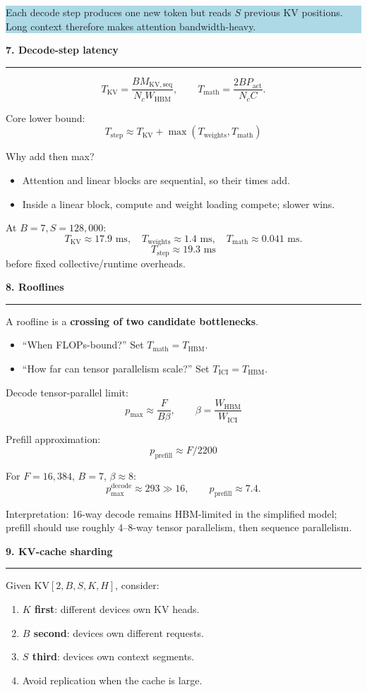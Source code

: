 \documentclass[8pt,a4paper]{extarticle}
\newcommand{\sect}[1]{%
  \vspace{2pt}%
  {\color{DeepBlue}\normalsize\bfseries #1}\par
  \vspace{0.5pt}\hrule\vspace{1.5pt}
}
\newcommand{\formula}[1]{%
  \[
    \boxed{\displaystyle #1}
  \]
}
\newcommand{\callout}[2][LightBlue]{%
  \vspace{1pt}\noindent
  \colorbox{#1}{%
    \parbox{\dimexpr\linewidth-2\fboxsep\relax}{\footnotesize #2}%
  }\vspace{1pt}
}
\begin{document}
\begin{multicols}{2}
\callout{%
Each decode step produces one new token but reads $S$ previous KV positions.
Long context therefore makes attention bandwidth-heavy.
}

\sect{7. Decode-step latency}

\[
T_{\mathrm{KV}}=
\frac{BM_{\mathrm{KV,seq}}}{N_cW_{\mathrm{HBM}}},
\qquad
T_{\mathrm{math}}=
\frac{2BP_{\mathrm{act}}}{N_cC}.
\]

Core lower bound:
\formula{
T_{\mathrm{step}}\approx
T_{\mathrm{KV}}+
\max(T_{\mathrm{weights}},T_{\mathrm{math}})
}

Why add then max?
\begin{itemize}
  \item Attention and linear blocks are sequential, so their times add.
  \item Inside a linear block, compute and weight loading compete; slower wins.
\end{itemize}

At $B=7,S=128{,}000$:
\[
T_{\mathrm{KV}}\approx17.9\text{ ms},\quad
T_{\mathrm{weights}}\approx1.4\text{ ms},\quad
T_{\mathrm{math}}\approx0.041\text{ ms}.
\]
\[
\boxed{T_{\mathrm{step}}\approx19.3\text{ ms}}
\]
before fixed collective/runtime overheads.

\sect{8. Rooflines}

A roofline is a \textbf{crossing of two candidate bottlenecks}.

\begin{itemize}
  \item ``When FLOPs-bound?'' Set $T_{\mathrm{math}}=T_{\mathrm{HBM}}$.
  \item ``How far can tensor parallelism scale?'' Set
  $T_{\mathrm{ICI}}=T_{\mathrm{HBM}}$.
\end{itemize}

Decode tensor-parallel limit:
\formula{
p_{\max}\approx\frac{F}{B\beta},
\qquad
\beta=\frac{W_{\mathrm{HBM}}}{W_{\mathrm{ICI}}}
}

Prefill approximation:
\formula{p_{\mathrm{prefill}}\approx F/2200}

For $F=16{,}384$, $B=7$, $\beta\approx8$:
\[
p_{\max}^{\mathrm{decode}}\approx293\gg16,
\qquad
p_{\mathrm{prefill}}\approx7.4.
\]

Interpretation: 16-way decode remains HBM-limited in the simplified model;
prefill should use roughly 4--8-way tensor parallelism, then sequence
parallelism.

\sect{9. KV-cache sharding}

Given $\mathrm{KV}[2,B,S,K,H]$, consider:
\begin{enumerate}
  \item \textbf{$K$ first}: different devices own KV heads.
  \item \textbf{$B$ second}: devices own different requests.
  \item \textbf{$S$ third}: devices own context segments.
  \item Avoid replication when the cache is large.
\end{enumerate}


\end{multicols}
\end{document}
